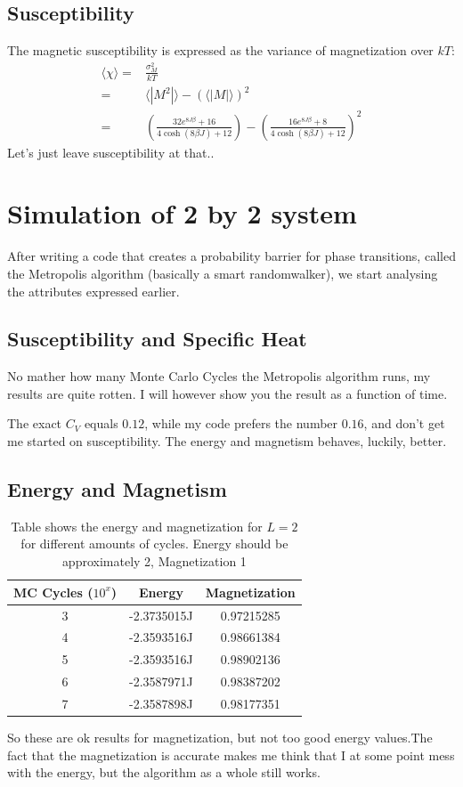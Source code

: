\documentclass[%
oneside,                 %
final,                   %
10pt]{article}
\begin{document}
\subsection*{Susceptibility}
The magnetic susceptibility is expressed as the variance of magnetization over $kT$:
\begin{equation}
\begin{split}
\langle  \chi  \rangle =& \frac{\sigma_M^2}{kT}\\
 =& \langle |M^2| \rangle - (\langle |M| \rangle)^2 \\
 =& \left( \frac{32e^{8J\beta} + 16}{4\cosh{(8\beta J)} +  12 }\right) - \left(\frac{16e^{8J\beta} + 8}{4\cosh{(8\beta J)} +  12 }\right)^2
\end{split}         
\end{equation}
Let's just leave susceptibility at that..


\section{Simulation of 2 by 2 system}
After writing a code that creates a probability barrier for phase transitions, called the Metropolis algorithm (basically a smart randomwalker),
we start analysing the attributes expressed earlier.
\subsection{Susceptibility and Specific Heat}
No mather how many Monte Carlo Cycles the Metropolis algorithm runs, my results are quite rotten.
I will however show you the result as a function of time.

The exact $C_V$ equals $0.12$, while my code prefers the number $0.16$, and don't get me started on susceptibility.
The energy and magnetism behaves, luckily, better.
\subsection{Energy and Magnetism}
\begin{table}
\begin{center}
\begin{tabular}{|c  c  c | }
  \hline
   MC Cycles ($10^x$)   &Energy & Magnetization \\ \hline
   3 & -2.3735015J & 0.97215285  \\ \hline
   4 & -2.3593516J & 0.98661384 \\ \hline
   5 & -2.3593516J & 0.98902136\\ \hline
   6 & -2.3587971J & 0.98387202 \\ \hline
   7 & -2.3587898J & 0.98177351\\ 
  \hline
\end{tabular}
\caption{Table shows the energy and magnetization for $L=2$ for different amounts of cycles. Energy should be approximately 2, Magnetization 1}
\label{tab1}
\end{center}
\end{table}
So these are ok results for magnetization, but not too good energy values.The fact that the magnetization is accurate makes me think that I at some point mess with the energy, but the algorithm as a whole
still works.
\end{document}
